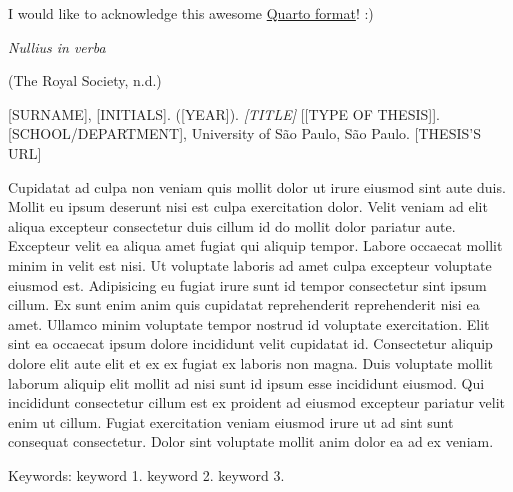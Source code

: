 
\begin{agradecimentos}
I would like to acknowledge this awesome
\href{https://github.com/danielvartan/tesesusp}{Quarto format}! :)
\end{agradecimentos}


\begin{epigrafe}
  \vspace*{\fill}
	\begin{flushright}
\emph{Nullius in verba}

(The Royal Society, n.d.)
	\end{flushright}
\end{epigrafe}


\setlength{\absparsep}{18pt}
\begin{resumo}
{[}SURNAME{]}, {[}INITIALS{]}. ({[}YEAR{]}). \emph{{[}TITLE{]}}
{[}{[}TYPE OF THESIS{]}{]}. {[}SCHOOL/DEPARTMENT{]}, University of São
Paulo, São Paulo. {[}THESIS'S URL{]}

Cupidatat ad culpa non veniam quis mollit dolor ut irure eiusmod sint
aute duis. Mollit eu ipsum deserunt nisi est culpa exercitation dolor.
Velit veniam ad elit aliqua excepteur consectetur duis cillum id do
mollit dolor pariatur aute. Excepteur velit ea aliqua amet fugiat qui
aliquip tempor. Labore occaecat mollit minim in velit est nisi. Ut
voluptate laboris ad amet culpa excepteur voluptate eiusmod est.
Adipisicing eu fugiat irure sunt id tempor consectetur sint ipsum
cillum. Ex sunt enim anim quis cupidatat reprehenderit reprehenderit
nisi ea amet. Ullamco minim voluptate tempor nostrud id voluptate
exercitation. Elit sint ea occaecat ipsum dolore incididunt velit
cupidatat id. Consectetur aliquip dolore elit aute elit et ex ex fugiat
ex laboris non magna. Duis voluptate mollit laborum aliquip elit mollit
ad nisi sunt id ipsum esse incididunt eiusmod. Qui incididunt
consectetur cillum est ex proident ad eiusmod excepteur pariatur velit
enim ut cillum. Fugiat exercitation veniam eiusmod irure ut ad sint sunt
consequat consectetur. Dolor sint voluptate mollit anim dolor ea ad ex
veniam.

Keywords: keyword 1. keyword 2. keyword 3.
\end{resumo}

